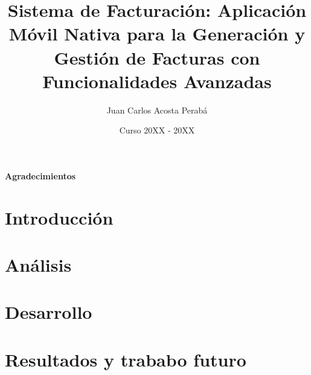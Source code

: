 \documentclass[oneside,12pt]{book}
\title{Sistema de Facturación: Aplicación Móvil Nativa para la Generación y Gestión de Facturas con Funcionalidades Avanzadas}
\author{Juan Carlos Acosta Perabá}
\date{Curso 20XX - 20XX}
\begin{document}




\newpage
{}
{\Large{\textbf{Agradecimientos}}}


\clearpage

\tableofcontents

\listofalgorithms 

\listoffigures

\listoftables


\clearpage
{}

\chapter{Introducción}
 

\chapter{Análisis}


\chapter{Desarrollo}


\chapter{Resultados y trababo futuro}


\vspace{1cm}



\clearpage


\printglossary[type=\acronymtype,title={Lista de acrónimos}]
\printglossary[title={Glosario de términos}]
\end{document}
